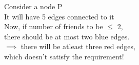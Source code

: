 \documentclass[preview]{standalone}
\begin{document}
\begin{center}
Consider a node P \\ It will have 5 edges connected to it \\ Now, if number of friends to be $\le$ 2,\\ there should be at most two blue edges. \\ $\implies$ there will be atleast three red edges, \\ which doesn't satisfy the requirement!
\end{center}
\end{document}
